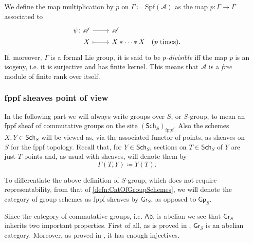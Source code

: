 \begin{defn}\label{defn:pDivisibleFormalLieGroup}
	We define the map multiplication by $p$ on $\Gamma \coloneqq \mathrm{Spf}(\mathscr{A})$
	as the map $p\colon \Gamma \to \Gamma$
	associated to 
	\begin{equation*}
	\begin{tikzcd}[row sep = 0ex
		,/tikz/column 1/.append style={anchor=base east}
		,/tikz/column 2/.append style={anchor=base west}]
		\psi\colon \mathscr{A} \arrow[r, "", rightarrow] &
		\mathscr{A} \\ %
		X \arrow[r, "", mapsto] & 
		X \ast \cdots \ast X
	\quad \text{($p$ times)}
	.\end{tikzcd}
	\end{equation*} 
	If, moreover, $\Gamma$ is a formal Lie group, 
	it is said to be {\em $p$-divisible} iff the map $p$ is 
	an isogeny, i.e. it is surjective and has finite kernel.
	This means that $\mathscr{A}$ is a {\em free} module of finite rank over itself.
\end{defn}



\subsubsection{fppf sheaves point of view}
In the following part we will always write groups over $S$, or $S$-group, to mean
an fppf sheaf of commutative groups on the site $(\mathsf{Sch}_{ S })_{\mathrm{fppf}}$.
Also the schemes $X, Y \in \mathsf{Sch}_{ S }$ will be viewed as, via the associated
functor of points, as sheaves on $S$ for the fppf topology.
Recall that, for $Y \in \mathsf{Sch}_{ S }$, sections on
$T \in \mathsf{Sch}_{ S }$ of $Y$ are just $T$-points and,
as usual with sheaves, will denote them by
\begin{equation*}
	\Gamma \left( T, Y \right) \coloneqq Y(T)
.\end{equation*}


\begin{ntt}[]\label{not:GrS} 
	To differentiate the above definition of $S$-group,
	which does not require representability, from that of \cref{defn:CatOfGroupSchemes}, we will
	denote the category of group schemes as fppf sheaves by $\mathsf{Gr}_S$,
	as opposed to $\mathsf{Gp}_S$.
\end{ntt}


\begin{rem}[]\label{rem:PropertiesGrS}
	Since the category of commutative groups, i.e. $\mathsf{Ab}$, is
	abelian we see that $\mathsf{Gr}_S$ inherits two important properties.
	First of all, as is proved in 
	\cite[\href{https://stacks.math.columbia.edu/tag/03CN}{Lemma 03CN}]{SP},
	$\mathsf{Gr}_S$ is an abelian category.
	Moreover, as proved in 
	\cite[\href{https://stacks.math.columbia.edu/tag/01DP}{Theorem 01DP}]{SP},
	it has enough injectives.
\end{rem}


